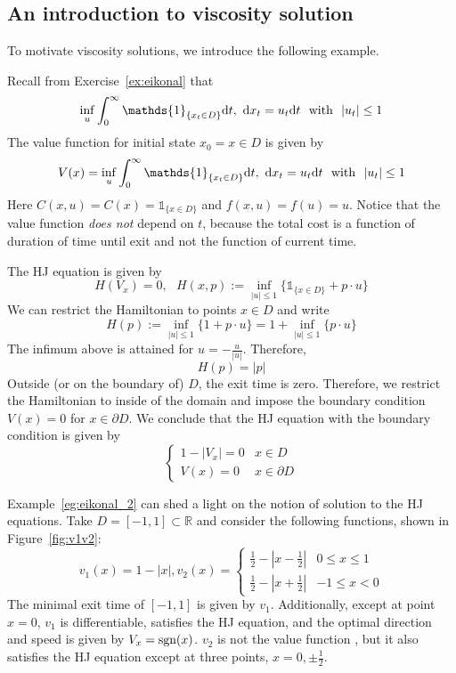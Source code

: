 \documentclass[11pt]{book}
\newcommand{\dt}{\text{\normalfont d}t}
\newcommand{\dx}{\text{\normalfont d}x}
\begin{document}
\subsection{An introduction to viscosity solution}
To motivate viscosity solutions, we introduce the following example.
\begin{eg}
\label{eg:eikonal_2}
    Recall from Exercise~\ref{ex:eikonal} that
    \[
        \inf_u\int_0^\infty \mathds{1}_{\{x_t\in D\}}{\dt},~{\dx}_t=u_t{{\dt}}~\text{ with }~|u_t|\le1
    \]
    The value function for initial state $x_0=x\in D$ is given by
    \[
        V(x)=\inf_u\int_0^\infty \mathds{1}_{\{x_t\in D\}}{\dt},~{\dx}_t=u_t{{\dt}}~\text{ with }~|u_t|\le1
    \]
    Here $C(x,u)=C(x)=\mathds{1}_{\{x\in D\}}$ and $f(x,u)=f(u)=u$.
    Notice that the value function \emph{does not} depend on $t$, because the total cost is a function of duration of time until exit and not the function of current time.

    The HJ equation is given by
    \[
    H(V_x)=0,~~~H(x,p):=\inf_{|u|\le1}\{\mathds{1}_{\{x\in D\}}+p\cdot u\}
    \]
    We can restrict the Hamiltonian to points $x\in D$ and write 
    \[
    H(p):=\inf_{|u|\le1}\{1+p\cdot u\}=1+\inf_{|u|\le1}\{p\cdot u\}
    \]
    The infimum above is attained for $u=-\frac{u}{|u|}$. Therefore,
    \[
    H(p)=|p|
    \]
    Outside (or on the boundary of) $D$, the exit time is zero. Therefore, we restrict the Hamiltonian to inside of the domain and impose the boundary condition $V(x)=0$ for $x\in\partial D$. We conclude that the HJ equation with the boundary condition is given by
    \[
    \begin{cases}
        1-|V_x|=0&x\in D\\
        V(x)=0&x\in \partial D
    \end{cases}
    \]
\end{eg}
Example~\ref{eg:eikonal_2} can shed a light on the notion of solution to the HJ equations. Take $D=[-1,1]\subset \mathbb{R}$ and consider the following functions,  shown in Figure~\ref{fig:v1v2}:
        \[
        v_1(x) = 1-|x|, v_2(x)= \begin{cases}
            \frac12-|x-\frac12|&0\le x\le1\\
            \frac12-|x+\frac12|&-1\le x<0
        \end{cases}
        \]
The minimal exit time of $[-1,1]$ is given by $v_1$. Additionally, except at point $x=0$, $v_1$ is differentiable, satisfies the HJ equation, and the optimal direction and speed is given by $V_x=\text{\normalfont sgn}(x)$. $v_2$ is not the value function  , but it also satisfies the HJ equation except at three points, $x=0,\pm\frac12$. 
\end{document}
